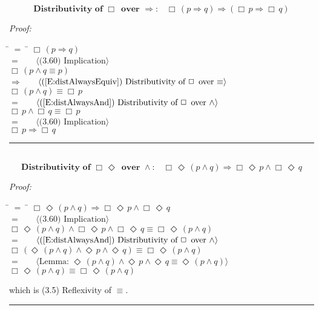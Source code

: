 \documentclass[fleqn, leqno]{article}
\newcommand{\lgap}{2pt} %
\newcommand{\mymathindent}{24pt} %
\newcommand{\Event}{\Diamond\,}
\newcommand{\Always}{\Box\,}
\newcommand{\myqed}{\hfill\rule[-.23ex]{1.2ex}{2.0ex}}
\newcommand{\Gll} {\langle} %
\newcommand{\Ggg} {\rangle} %
\newcommand{\Hint}[1] {\ \ \ $\Gll \mbox{#1} \Ggg$ } %
\begin{document}
\begin{equation}\label{E:distAlwaysImp}
\textbf{Distributivity of $\Always$ over $\Rightarrow$:}\quad \Always (p \Rightarrow q) \Rightarrow (\Always p \Rightarrow \Always q)
\end{equation}

\emph{Proof:}
\begin{tabbing}
\hspace{\mymathindent} \= $= \;$ \= \kill
\> \> $\Always (p \Rightarrow q)$\\[\lgap]
\> $=$ \> \Hint{(3.60) Implication}\\[\lgap]
\> \> $\Always (p \land q \equiv p)$\\[\lgap]
\> $\Rightarrow$ \> \Hint{(\ref{E:distAlwaysEquiv}) Distributivity of $\Always$ over $\equiv$}\\[\lgap]
\> \> $\Always(p \land q) \equiv \Always p$\\[\lgap]
\> $=$ \> \Hint{(\ref{E:distAlwaysAnd}) Distributivity of $\Always$ over $\land$}\\[\lgap]
\> \> $\Always p \land \Always q \equiv \Always p$\\[\lgap]
\> $=$ \> \Hint{(3.60) Implication}\\[\lgap]
\> \> $\Always p \Rightarrow \Always q$\\[\lgap]
\end{tabbing}
\myqed\\[\lgap]


\begin{equation}\label{E:distAlwaysEventAnd}
\textbf{Distributivity of $\Always\Event$ over $\land$:}\quad \Always\Event(p \land q) \Rightarrow \Always\Event p \land \Always\Event q
\end{equation}

\emph{Proof:}
\begin{tabbing}
\hspace{\mymathindent} \= $= \;$ \= \kill
\> \> $\Always\Event(p \land q) \Rightarrow \Always\Event p \land \Always\Event q$\\[\lgap]
\> $=$ \> \Hint{(3.60) Implication}\\[\lgap]
\> \> $\Always\Event(p \land q) \land \Always\Event p \land \Always\Event q \equiv \Always\Event(p \land q)$\\[\lgap]
\> $=$ \> \Hint{(\ref{E:distAlwaysAnd}) Distributivity of $\Always$ over $\land$}\\[\lgap]
\> \> $\Always(\Event(p \land q) \land \Event p \land \Event q) \equiv \Always\Event(p \land q)$\\[\lgap]
\> $=$ \> \Hint{Lemma: $\Event(p \land q) \land \Event p \land \Event q \equiv \Event(p \land q)$}\\[\lgap]
\> \> $\Always\Event(p \land q) \equiv \Always\Event(p \land q)$\\[\lgap]
\end{tabbing}
which is (3.5) Reflexivity of $\equiv$. \myqed\\[\lgap]
\end{document}

